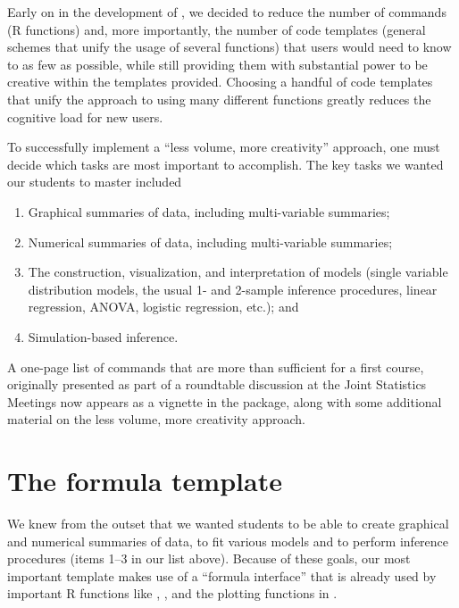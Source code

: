 Early on in the development of , we decided to reduce the
number of commands (R functions) and, more importantly, the number of
code templates (general schemes that unify the usage of several
functions) that users would need to know to as few as possible, while
still providing them with substantial power to be creative within the
templates provided. Choosing a handful of code templates that unify the
approach to using many different functions greatly reduces the cognitive
load for new users.

To successfully implement a ``less volume, more creativity'' approach,
one must decide which tasks are most important to accomplish. The key
tasks we wanted our students to master included

\begin{enumerate}
\def\labelenumi{\arabic{enumi}.}
\tightlist
\item
  Graphical summaries of data, including multi-variable summaries;
\item
  Numerical summaries of data, including multi-variable summaries;
\item
  The construction, visualization, and interpretation of models (single
  variable distribution models, the usual 1- and 2-sample inference
  procedures, linear regression, ANOVA, logistic regression, etc.); and
\item
  Simulation-based inference.
\end{enumerate}

A one-page list of commands that are more than sufficient for a first
course, originally presented as part of a roundtable discussion at the
Joint Statistics Meetings \citep{Pruim:MinimalR:2011} now appears as a
vignette in the package, along with some additional material on the less
volume, more creativity approach.

\section{The formula template}\label{the-formula-template}

We knew from the outset that we wanted students to be able to create
graphical and numerical summaries of data, to fit various models and to
perform inference procedures (items 1--3 in our list above). Because of
these goals, our most important template makes use of a ``formula
interface'' that is already used by important R functions like
, , and the plotting functions in
 \citep{lattice}.

